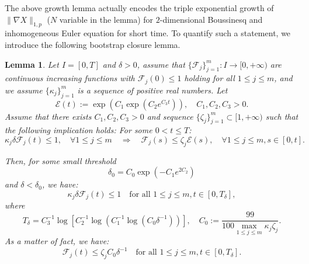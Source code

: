 \documentclass[12pt,letterpaper]{article}
\newtheorem{lem}[thm]{Lemma}
\theoremstyle{plain}
\begin{document}
The above growth lemma actually encodes the triple exponential growth of $\lVert\nabla X\rVert_{1,p}$ ($N$ variable in the lemma) for $2$-dimensional Boussinesq and inhomogeneous Euler equation for short time. To quantify such a statement, we introduce the following bootstrap closure lemma.
\begin{lem}\label{Bootstrap Closure Lemma}
 Let $I=[0,T]$ and $\delta>0$, assume that $\{\mathcal F_j\}_{j=1}^m: I\to [0,+\infty)$ are continuous increasing functions with $\mathcal F_j(0)\le 1$ holding for all $1\le j\le m$, and we assume $\{\kappa_j\}_{j=1}^m$ is a sequence of positive real numbers. Let
 \begin{equation*}
  \mathcal E(t):=\exp(C_1\exp(C_2 e^{C_3t})),\quad C_1,C_2,C_3>0.   
 \end{equation*}
 Assume that there exists $C_1,C_2,C_3>0$ and sequence $\{\zeta_j\}_{j=1}^m \subset [1,+\infty)$ such that the following implication holds: For some $0<t\le T$:
 \begin{equation}\label{Bootstrap Implication}
\kappa_j\delta \mathcal F_j(t)\le 1,\quad\forall 1\le j\le m \quad\Longrightarrow\quad   \mathcal F_j(s)\le \zeta_j\mathcal E(s), \quad\forall 1\le j\le m, s\in [0,t].
 \end{equation}

 Then, for some small threshold 
 \begin{equation}\label{Delta0 Definition}
  \delta_0=C_0\exp(-C_1 e^{2C_2})  
 \end{equation}
 and $\delta<\delta_0$, we have: 
 \begin{equation*}
  \kappa_j\delta \mathcal F_j(t)\le 1  \quad\text{for all }1\le j\le m , t\in[0,T_\delta], 
 \end{equation*}
 where
 \begin{equation}\label{Triple Log Lifespan}
  T_\delta=C_3^{-1}\log[C_2^{-1}\log(C_1^{-1}\log(C_0\delta^{-1}))],\quad C_0:=\frac{99}{100\max_{1\le j\le m}  \kappa_j \zeta_j}.
 \end{equation}
 As a matter of fact, we have:
 \begin{equation}\label{Finiteness on Bootstrap interval}
   \mathcal F_j(t)  \le \zeta_j C_0\delta^{-1}\quad\text{for all }1\le j\le m, t\in[0,T_\delta].
 \end{equation}
\end{lem}
\end{document}
